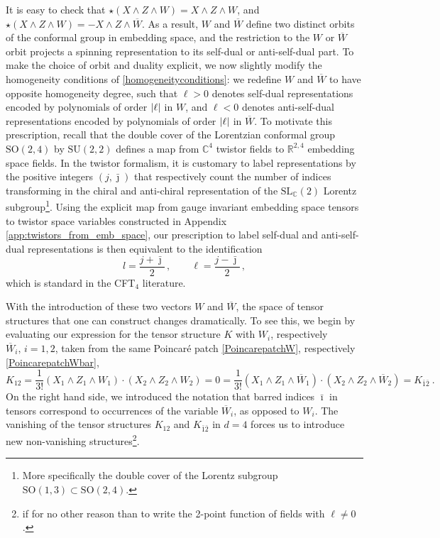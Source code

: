 \documentclass{article}
\def \Rs {\mathbb{R}}
\def \Cs {\mathbb{C}}
\begin{document}
It is easy to check that $\star (X\wedge Z \wedge W) = X \wedge Z\wedge W$, and $\star (X\wedge Z \wedge W) = - X \wedge Z\wedge \overline{W}$. As a result, $W$ and $\overline{W}$ define two distinct orbits of the conformal group in embedding space, and the restriction to the $W$ or $\overline{W}$ orbit projects a spinning representation to its self-dual or anti-self-dual part. To make the choice of orbit and duality explicit, we now slightly modify the homogeneity conditions of \eqref{homogeneityconditions}: we redefine $W$ and $\overline{W}$ to have opposite homogeneity degree, such that $\ell > 0$ denotes self-dual representations encoded by polynomials of order $\abs{\ell}$ in $W$, and $\ell < 0$ denotes anti-self-dual representations encoded by polynomials of order $\abs{\ell}$ in $\overline{W}$. To motivate this prescription, recall that the double cover of the Lorentzian conformal group $\mathrm{SO}(2,4)$ by $\mathrm{SU}(2,2)$ defines a map from $\Cs^4$ twistor fields to $\Rs^{2,4}$ embedding space fields. In the twistor formalism, it is customary to label representations by the positive integers $(j,\bar{\jmath})$ that respectively count the number of indices transforming in the chiral and anti-chiral representation of the $\mathrm{SL}_{\Cs}(2)$ Lorentz subgroup\footnote{More specifically the double cover of the Lorentz subgroup $\mathrm{SO}(1,3)\subset \mathrm{SO}(2,4)$.}. Using the explicit map from gauge invariant embedding space tensors to twistor space variables constructed in Appendix \ref{app:twistors_from_emb_space}, our prescription to label self-dual and anti-self-dual representations is then equivalent to the identification
\begin{equation}
    l=\frac{j+\bar{\jmath}}{2}\,, \qquad \ell=\frac{j-\bar{\jmath}}{2}\,,
\end{equation}
which is standard in the CFT$_4$ literature. 
\smallskip 

With the introduction of these two vectors $W$ and $\overline{W}$, the space of tensor 
structures that one can construct changes dramatically. To see this, we begin by 
evaluating our expression for the tensor structure $K$ with $W_i$, respectively $\overline{W}_i, \,
i=1,2$, taken from the same Poincar\'e patch \eqref{PoincarepatchW}, respectively 
\eqref{PoincarepatchWbar}, 
\begin{equation} \label{eq:Kvanish} 
    K_{12}=\frac{1}{3!}\left(X_1\wedge Z_1\wedge W_1\right)\cdot \left(X_2\wedge Z_2 \wedge
    W_2\right)=0 = \frac{1}{3!}\left(X_1\wedge Z_1\wedge \overline{W}_1\right)\cdot 
    \left(X_2\wedge Z_2 \wedge \overline{W}_2\right) = K_{\bar{1}\bar{2}}\ . 
\end{equation}
On the right hand side, we introduced the notation that barred indices $\bar{\imath}$ 
in tensors correspond to occurrences of the variable $\overline{W}_i$, as opposed to 
$W_i$. The vanishing of the tensor structures $K_{12}$ and $K_{\bar{1}\bar{2}}$ in $d=4$ 
forces us to introduce new non-vanishing structures\footnote{if for no other reason than to write the 2-point function of fields with $\ell \neq 0$.}. 
\end{document}
